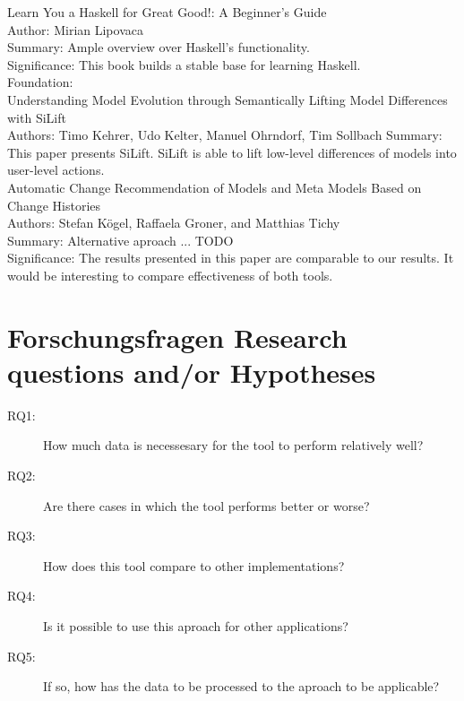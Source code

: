 \documentclass[10pt,a4paper,oneside]{scrartcl}
\begin{document}
	
	Learn You a Haskell for Great Good!: A Beginner's Guide\\
	Author: Mirian Lipovaca\\
	Summary: Ample overview over Haskell's functionality.\\
	Significance: This book builds a stable base for learning Haskell.\\
	
	
	Foundation:\\
	Understanding Model Evolution through Semantically Lifting Model Differences with SiLift\\
	Authors: Timo Kehrer, Udo Kelter, Manuel Ohrndorf, Tim Sollbach
	Summary: This paper presents SiLift. SiLift is able to lift low-level differences of models into user-level actions.\\
	
	
	Automatic Change Recommendation of Models and Meta Models Based on Change Histories\\
	Authors: Stefan Kögel, Raffaela Groner, and Matthias Tichy\\
	Summary: Alternative aproach ... TODO\\
	Significance: The results presented in this paper are comparable to our results. It would be interesting to compare effectiveness of both tools.\\
	
	\section{
		{Forschungsfragen}
		{Research questions and/or Hypotheses}}
	\label{sub:questions}
	
	\begin{description}
		\item[RQ1:] How much data is necessesary for the tool to perform relatively well?
		\item[RQ2:] Are there cases in which the tool performs better or worse?
		\item[RQ3:] How does this tool compare to other implementations?
		\item[RQ4:] Is it possible to use this aproach for other applications?
		\item[RQ5:] If so, how has the data to be processed to the aproach to be applicable?
	\end{description}
	
\end{document}
